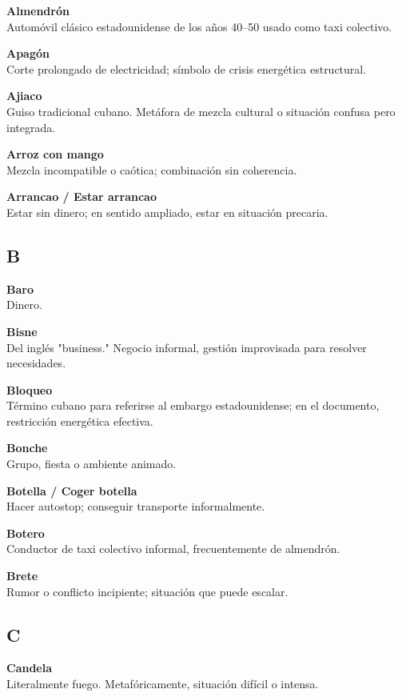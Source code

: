 \documentclass[12pt]{article}
\begin{document}
\textbf{Almendrón}\\
Automóvil clásico estadounidense de los años 40--50 usado como taxi colectivo.

\textbf{Apagón}\\
Corte prolongado de electricidad; símbolo de crisis energética estructural.

\textbf{Ajiaco}\\
Guiso tradicional cubano. Metáfora de mezcla cultural o situación confusa pero integrada.

\textbf{Arroz con mango}\\
Mezcla incompatible o caótica; combinación sin coherencia.

\textbf{Arrancao / Estar arrancao}\\
Estar sin dinero; en sentido ampliado, estar en situación precaria.

\subsection*{B}

\textbf{Baro}\\
Dinero.

\textbf{Bisne}\\
Del inglés "business." Negocio informal, gestión improvisada para resolver necesidades.

\textbf{Bloqueo}\\
Término cubano para referirse al embargo estadounidense; en el documento, restricción energética efectiva.

\textbf{Bonche}\\
Grupo, fiesta o ambiente animado.

\textbf{Botella / Coger botella}\\
Hacer autostop; conseguir transporte informalmente.

\textbf{Botero}\\
Conductor de taxi colectivo informal, frecuentemente de almendrón.

\textbf{Brete}\\
Rumor o conflicto incipiente; situación que puede escalar.

\subsection*{C}

\textbf{Candela}\\
Literalmente fuego. Metafóricamente, situación difícil o intensa.
\end{document}

